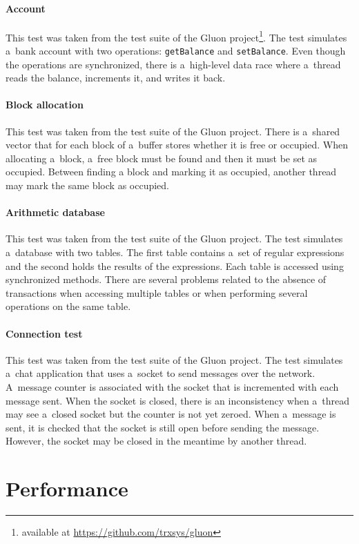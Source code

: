 \paragraph{Account}
This test was taken from the test suite of the Gluon project\footnote{available
at \url{https://github.com/trxsys/gluon}}. The test simulates a~bank account
with two operations: \texttt{getBalance} and \texttt{setBalance}. Even though
the operations are synchronized, there is a~high-level data race where a~thread
reads the balance, increments it, and writes it back.

\paragraph{Block allocation}
This test was taken from the test suite of the Gluon project. There is a~shared
vector that for each block of a~buffer stores whether it is free or occupied.
When allocating a~block, a~free block must be found and then it must be set as
occupied. Between finding a block and marking it as occupied, another thread may
mark the same block as occupied.

\paragraph{Arithmetic database}
This test was taken from the test suite of the Gluon project. The test simulates
a~database with two tables. The first table contains a~set of regular
expressions and the second holds the results of the expressions. Each table is
accessed using synchronized methods. There are several problems related to the
absence of transactions when accessing multiple tables or when performing
several operations on the same table.

\paragraph{Connection test}
This test was taken from the test suite of the Gluon project. The test simulates
a~chat application that uses a~socket to send messages over the network.
A~message counter is associated with the socket that is incremented with each
message sent. When the socket is closed, there is an inconsistency when a~thread
may see a~closed socket but the counter is not yet zeroed. When a~message is
sent, it is checked that the socket is still open before sending the message.
However, the socket may be closed in the meantime by another thread.


\section{Performance}
\todo{}



